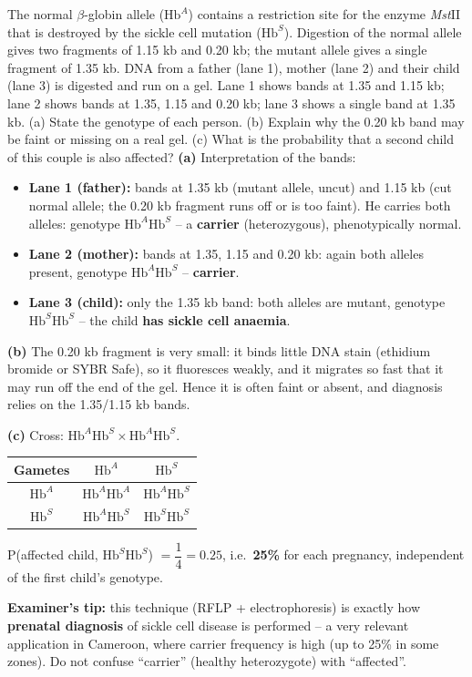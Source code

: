 \documentclass[11pt]{article}
\begin{document}
\begin{exoresolu}
The normal $\beta$-globin allele ($\mathrm{Hb}^A$) contains a restriction site for the enzyme \emph{Mst}II that is destroyed by the sickle cell mutation ($\mathrm{Hb}^S$). Digestion of the normal allele gives two fragments of 1.15 kb and 0.20 kb; the mutant allele gives a single fragment of 1.35 kb. DNA from a father (lane 1), mother (lane 2) and their child (lane 3) is digested and run on a gel. Lane 1 shows bands at 1.35 and 1.15 kb; lane 2 shows bands at 1.35, 1.15 and 0.20 kb; lane 3 shows a single band at 1.35 kb. (a) State the genotype of each person. (b) Explain why the 0.20 kb band may be faint or missing on a real gel. (c) What is the probability that a second child of this couple is also affected?
\tcblower
\textbf{(a)} Interpretation of the bands:
\begin{itemize}
\item \textbf{Lane 1 (father):} bands at 1.35 kb (mutant allele, uncut) and 1.15 kb (cut normal allele; the 0.20 kb fragment runs off or is too faint). He carries both alleles: genotype $\mathrm{Hb}^A\mathrm{Hb}^S$ -- a \textbf{carrier} (heterozygous), phenotypically normal.
\item \textbf{Lane 2 (mother):} bands at 1.35, 1.15 and 0.20 kb: again both alleles present, genotype $\mathrm{Hb}^A\mathrm{Hb}^S$ -- \textbf{carrier}.
\item \textbf{Lane 3 (child):} only the 1.35 kb band: both alleles are mutant, genotype $\mathrm{Hb}^S\mathrm{Hb}^S$ -- the child \textbf{has sickle cell anaemia}.
\end{itemize}
\textbf{(b)} The 0.20 kb fragment is very small: it binds little DNA stain (ethidium bromide or SYBR Safe), so it fluoresces weakly, and it migrates so fast that it may run off the end of the gel. Hence it is often faint or absent, and diagnosis relies on the 1.35/1.15 kb bands.

\textbf{(c)} Cross: $\mathrm{Hb}^A\mathrm{Hb}^S \times \mathrm{Hb}^A\mathrm{Hb}^S$.
\begin{center}
\begin{tabular}{|c|c|c|}
\hline
\rowcolor{popblueL} Gametes & $\mathrm{Hb}^A$ & $\mathrm{Hb}^S$ \\
\hline $\mathrm{Hb}^A$ & $\mathrm{Hb}^A\mathrm{Hb}^A$ & $\mathrm{Hb}^A\mathrm{Hb}^S$ \\
\hline $\mathrm{Hb}^S$ & $\mathrm{Hb}^A\mathrm{Hb}^S$ & $\mathrm{Hb}^S\mathrm{Hb}^S$ \\
\hline
\end{tabular}
\end{center}
P(affected child, $\mathrm{Hb}^S\mathrm{Hb}^S$) $= \dfrac{1}{4} = 0.25$, i.e.\ \textbf{25\%} for each pregnancy, independent of the first child's genotype.

\textbf{Examiner's tip:} this technique (RFLP + electrophoresis) is exactly how \textbf{prenatal diagnosis} of sickle cell disease is performed -- a very relevant application in Cameroon, where carrier frequency is high (up to 25\% in some zones). Do not confuse ``carrier'' (healthy heterozygote) with ``affected''.
\end{exoresolu}
\end{document}
